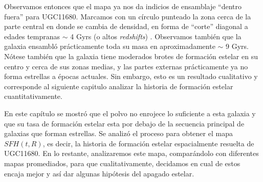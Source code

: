 \bigskip

\noindent Observamos entonces que el mapa ya nos da indicios de ensamblaje ``dentro fuera'' para UGC11680. Marcamos con un círculo punteado la zona cerca de la parte central en donde se cambia de densidad, en forma de ``corte'' diagonal a edades tempranas $\sim$ 4 Gyrs (o altos \textsl{redshifts}) . Observamos también que la galaxia ensambló prácticamente toda su masa en aproximadamente $\sim$ 9 Gyrs.
Nótese también que la galaxia tiene moderados brotes de formación estelar en su centro y cerca de sus zonas medias,
y las partes externas prácticamente ya no forma estrellas a épocas actuales. Sin embargo, esto es un resultado cualitativo y corresponde al siguiente capitulo analizar la historia de formación estelar cuantitativamente.

\bigskip



\noindent En este capítulo se mostró que el polvo no enrojece lo suficiente a esta galaxia y que su tasa de formación estelar
esta por debajo de la secuencia principal de galaxias que forman estrellas.
Se analizó el proceso para obtener el mapa $SFH(t,R)$, es decir, la historia de formación estelar espacialmente resuelta de UGC11680.
En lo restante, analizaremos este mapa, comparándolo con diferentes mapas promediados, para que cualitativamente,
decidamos en cual de estos encaja mejor y así dar algunas hipótesis del apagado estelar.
























